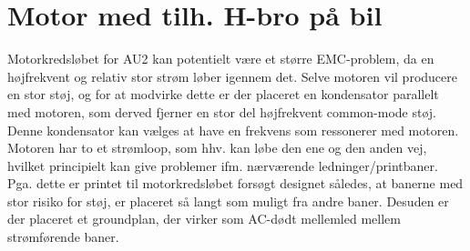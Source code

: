 \section{Motor med tilh. H-bro på bil}

Motorkredsløbet for AU2 kan potentielt være et større EMC-problem, da en højfrekvent og relativ stor strøm løber igennem det. Selve motoren vil producere en stor støj, og for at modvirke dette er der placeret en kondensator parallelt med motoren, som derved fjerner en stor del højfrekvent common-mode støj. Denne kondensator kan vælges at have en frekvens som ressonerer med motoren. Motoren har to et strømloop, som hhv. kan løbe den ene og den anden vej, hvilket principielt kan give problemer ifm. nærværende ledninger/printbaner. Pga. dette er printet til motorkredsløbet forsøgt designet således, at banerne med stor risiko for støj, er placeret så langt som muligt fra andre baner. Desuden er der placeret et groundplan, der virker som AC-dødt mellemled mellem strømførende baner.

